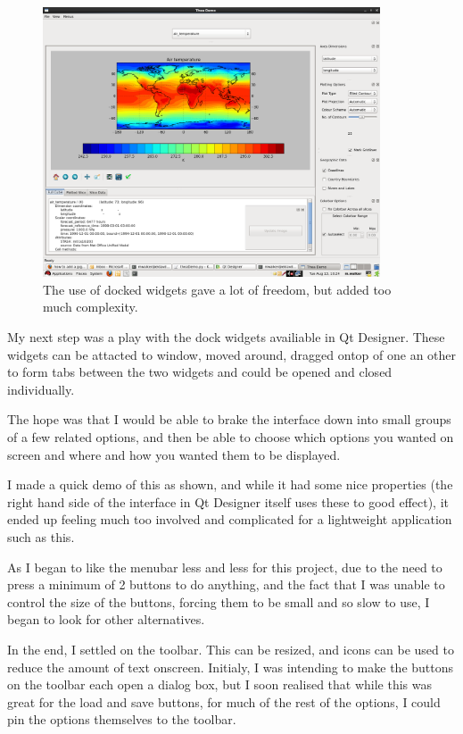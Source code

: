 \documentclass[whitecover]{MO_report}
\begin{document}
\vspace{4mm}

\begin{figure}[ht!]
\centering
\includegraphics[width=100mm]{resources/version3.png}
\caption{The use of docked widgets gave a lot of freedom, but added too much
complexity.}
\label{overflow}
\end{figure}

My next step was a play with the dock widgets availiable in Qt Designer.
These widgets can be attacted to window, moved around, dragged ontop of one an
other to form tabs between the two widgets and could be opened and closed
individually.

The hope was that I would be able to brake the interface down into
small groups of a few related options, and then be able to choose which options
you wanted on screen and where and how you wanted them to be displayed.

I made a quick demo of this as shown, and while it had some nice properties
(the right hand side of the interface in Qt Designer itself uses these to good
effect), it ended up feeling much too involved and complicated for a lightweight
application such as this.

\vspace{4mm}

As I began to like the menubar less and less for this project, due to the need
to press a minimum of 2 buttons to do anything, and the fact that I was unable to
control the size of the buttons, forcing them to be small and so slow to use, I
began to look for other alternatives.

In the end, I settled on the toolbar. This can be resized, and icons can be
used to reduce the amount of text onscreen. Initialy, I was intending to
make the buttons on the toolbar each open a dialog box, but I soon realised
that while this was great for the load and save buttons, for much of the rest
of the options, I could pin the options themselves to the toolbar.
\end{document}
